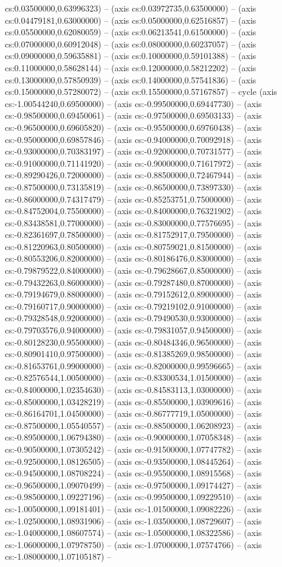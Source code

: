 cs:0.03500000,0.63996323) -- (axis cs:0.03972735,0.63500000) -- (axis cs:0.04479181,0.63000000) -- (axis cs:0.05000000,0.62516857) -- (axis cs:0.05500000,0.62080059) -- (axis cs:0.06213541,0.61500000) -- (axis cs:0.07000000,0.60912048) -- (axis cs:0.08000000,0.60237057) -- (axis cs:0.09000000,0.59635881) -- (axis cs:0.10000000,0.59101388) -- (axis cs:0.11000000,0.58628144) -- (axis cs:0.12000000,0.58212202) -- (axis cs:0.13000000,0.57850939) -- (axis cs:0.14000000,0.57541836) -- (axis cs:0.15000000,0.57280072) -- (axis cs:0.15500000,0.57167857) -- cycle (axis cs:-1.00544240,0.69500000) -- (axis cs:-0.99500000,0.69447730) -- (axis cs:-0.98500000,0.69450061) -- (axis cs:-0.97500000,0.69503133) -- (axis cs:-0.96500000,0.69605820) -- (axis cs:-0.95500000,0.69760438) -- (axis cs:-0.95000000,0.69857846) -- (axis cs:-0.94000000,0.70092918) -- (axis cs:-0.93000000,0.70383197) -- (axis cs:-0.92000000,0.70731577) -- (axis cs:-0.91000000,0.71141920) -- (axis cs:-0.90000000,0.71617972) -- (axis cs:-0.89290426,0.72000000) -- (axis cs:-0.88500000,0.72467944) -- (axis cs:-0.87500000,0.73135819) -- (axis cs:-0.86500000,0.73897330) -- (axis cs:-0.86000000,0.74317479) -- (axis cs:-0.85253751,0.75000000) -- (axis cs:-0.84752004,0.75500000) -- (axis cs:-0.84000000,0.76321902) -- (axis cs:-0.83438581,0.77000000) -- (axis cs:-0.83000000,0.77576695) -- (axis cs:-0.82361697,0.78500000) -- (axis cs:-0.81752917,0.79500000) -- (axis cs:-0.81220963,0.80500000) -- (axis cs:-0.80759021,0.81500000) -- (axis cs:-0.80553206,0.82000000) -- (axis cs:-0.80186476,0.83000000) -- (axis cs:-0.79879522,0.84000000) -- (axis cs:-0.79628667,0.85000000) -- (axis cs:-0.79432263,0.86000000) -- (axis cs:-0.79287480,0.87000000) -- (axis cs:-0.79194679,0.88000000) -- (axis cs:-0.79152612,0.89000000) -- (axis cs:-0.79160717,0.90000000) -- (axis cs:-0.79219102,0.91000000) -- (axis cs:-0.79328548,0.92000000) -- (axis cs:-0.79490530,0.93000000) -- (axis cs:-0.79703576,0.94000000) -- (axis cs:-0.79831057,0.94500000) -- (axis cs:-0.80128230,0.95500000) -- (axis cs:-0.80484346,0.96500000) -- (axis cs:-0.80901410,0.97500000) -- (axis cs:-0.81385269,0.98500000) -- (axis cs:-0.81653761,0.99000000) -- (axis cs:-0.82000000,0.99596665) -- (axis cs:-0.82576544,1.00500000) -- (axis cs:-0.83300534,1.01500000) -- (axis cs:-0.84000000,1.02354630) -- (axis cs:-0.84583113,1.03000000) -- (axis cs:-0.85000000,1.03428219) -- (axis cs:-0.85500000,1.03909616) -- (axis cs:-0.86164701,1.04500000) -- (axis cs:-0.86777719,1.05000000) -- (axis cs:-0.87500000,1.05540557) -- (axis cs:-0.88500000,1.06208923) -- (axis cs:-0.89500000,1.06794380) -- (axis cs:-0.90000000,1.07058348) -- (axis cs:-0.90500000,1.07305242) -- (axis cs:-0.91500000,1.07747782) -- (axis cs:-0.92500000,1.08126505) -- (axis cs:-0.93500000,1.08445264) -- (axis cs:-0.94500000,1.08708224) -- (axis cs:-0.95500000,1.08915568) -- (axis cs:-0.96500000,1.09070499) -- (axis cs:-0.97500000,1.09174427) -- (axis cs:-0.98500000,1.09227196) -- (axis cs:-0.99500000,1.09229510) -- (axis cs:-1.00500000,1.09181401) -- (axis cs:-1.01500000,1.09082226) -- (axis cs:-1.02500000,1.08931906) -- (axis cs:-1.03500000,1.08729607) -- (axis cs:-1.04000000,1.08607574) -- (axis cs:-1.05000000,1.08322586) -- (axis cs:-1.06000000,1.07978750) -- (axis cs:-1.07000000,1.07574766) -- (axis cs:-1.08000000,1.07105187) -- 